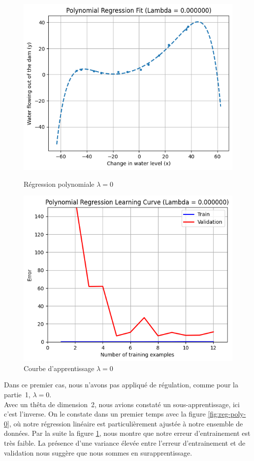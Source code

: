 \begin{figure}[!h]
    \begin{minipage}{.48\linewidth}
        \begin{center}
            \includegraphics[width=.8\textwidth]{./img/5.1(1).png}
            \caption{\label{fig:reg-poly-0}Régression polynomiale $\lambda = 0$}  
        \end{center}
    \end{minipage}\hfill
    \begin{minipage}{.48\linewidth}
        \begin{center}
            \includegraphics[width=.8\textwidth]{./img/5.1(2).png}
            \caption{\label{fig:learning-curve-poly-0}Courbe d'apprentissage $\lambda = 0$}  
        \end{center}
    \end{minipage}
\end{figure}

Dans ce premier cas, nous n'avons pas appliqué de régulation, comme pour la partie~1, $\lambda = 0$. \\
Avec un thêta de dimension~2, nous avions constaté un sous-apprentissage, ici c'est l'inverse. On le constate dans un premier temps avec la figure \ref{fig:reg-poly-0}, où notre régression linéaire est particulièrement ajustée à notre ensemble de données. Par la suite la figure 
\ref{fig:learning-curve-poly-0}, nous montre que notre erreur d'entrainement est très faible. La présence d'une variance élevée entre l'erreur d'entrainement et de validation nous suggère que nous sommes en surapprentissage.


